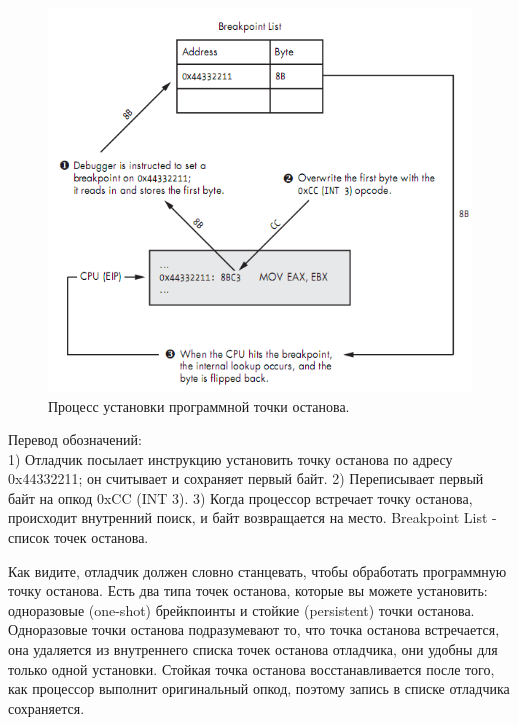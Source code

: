 \documentclass[12pt, a4paper, oneside]{book}
\begin{document}
\begin{figure}
  \center
  \includegraphics{./pic/chap2/3.PNG}
  \caption{Процесс установки программной точки останова.}
\end{figure}

Перевод обозначений:\\

     1) Отладчик посылает инструкцию установить точку останова по адресу 0x44332211; он считывает и сохраняет первый байт.
     2) Переписывает первый байт на опкод 0xCC (INT 3).
     3) Когда процессор встречает точку останова, происходит внутренний поиск, и байт возвращается на место.
     Breakpoint List - список точек останова.


Как видите, отладчик должен словно станцевать, чтобы обработать программную точку останова. Есть два типа точек останова, которые вы можете установить: одноразовые (one-shot) брейкпоинты и стойкие (persistent) точки останова. Одноразовые точки останова подразумевают то, что точка останова встречается, она удаляется из внутреннего списка точек останова отладчика, они удобны для только одной установки. Стойкая точка останова восстанавливается после того, как процессор выполнит оригинальный опкод, поэтому запись в списке отладчика сохраняется.\\
\end{document}

